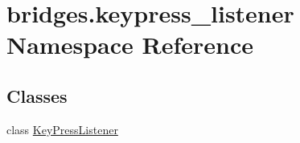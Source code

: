 \hypertarget{namespacebridges_1_1keypress__listener}{}\section{bridges.\+keypress\+\_\+listener Namespace Reference}
\label{namespacebridges_1_1keypress__listener}
\subsection*{Classes}
\begin{DoxyCompactItemize}
\item 
class \hyperlink{classbridges_1_1keypress__listener_1_1_key_press_listener}{Key\+Press\+Listener}
\end{DoxyCompactItemize}
